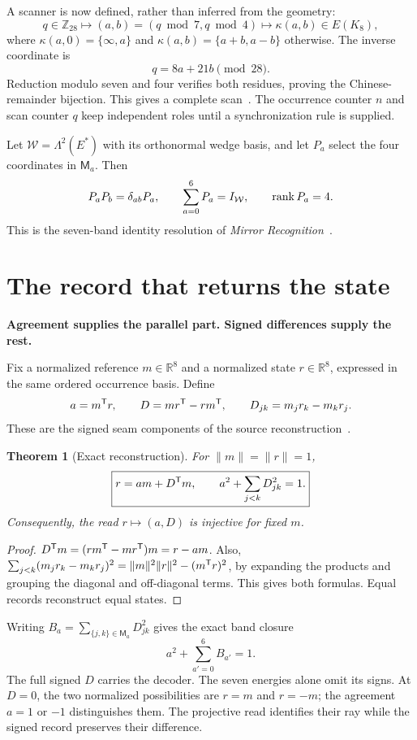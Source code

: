 \documentclass[11pt]{article}
\newtheorem{theorem}{Theorem}[section]
\theoremstyle{definition}\newtheorem{definition}[theorem]{Definition}
\newcommand{\R}{\mathbb R}\newcommand{\C}{\mathbb C}\newcommand{\Z}{\mathbb Z}\newcommand{\N}{\mathbb N}\newcommand{\PP}{\mathbb P}
\newcommand{\lead}[1]{\textbf{#1}\par}
\newcommand{\page}{\clearpage}
\begin{document}
A scanner is now defined, rather than inferred from the geometry:
\begin{equation}
 q\in\Z_{28}\longmapsto(a,b)=(q\bmod7,q\bmod4)
 \longmapsto\kappa(a,b)\in E(K_8),
\end{equation}
where $\kappa(a,0)=\{\infty,a\}$ and $\kappa(a,b)=\{a+b,a-b\}$ otherwise. The inverse coordinate is
\begin{equation}
 q=8a+21b\pmod{28}.
\end{equation}
Reduction modulo seven and four verifies both residues, proving the Chinese-remainder bijection. This gives a complete scan~\cite[\S6]{LM11}. The occurrence counter $n$ and scan counter $q$ keep independent roles until a synchronization rule is supplied.

Let $\mathcal W=\Lambda^2(E^*)$ with its orthonormal wedge basis, and let $P_a$ select the four coordinates in $\mathsf M_a$. Then
\begin{equation}
 P_aP_b=\delta_{ab}P_a,\qquad\sum_{a=0}^{6}P_a=I_{\mathcal W},\qquad\operatorname{rank} P_a=4.
 \label{eq:resolution}
\end{equation}
This is the seven-band identity resolution of \emph{Mirror Recognition}~\cite[\S9]{MR}.

\page
\section{The record that returns the state}
\lead{Agreement supplies the parallel part. Signed differences supply the rest.}
Fix a normalized reference $m\in\R^8$ and a normalized state $r\in\R^8$, expressed in the same ordered occurrence basis. Define
\begin{equation}
 a=m^\mathsf T r,\qquad D=mr^\mathsf T-rm^\mathsf T,\qquad
 D_{jk}=m_jr_k-m_kr_j.
 \label{eq:record}
\end{equation}
These are the signed seam components of the source reconstruction~\cite[\S8]{MR}.

\begin{theorem}[Exact reconstruction]
For $\|m\|=\|r\|=1$,
\begin{equation}
 \boxed{r=am+D^\mathsf T m,\qquad a^2+\sum_{j<k}D_{jk}^2=1.}
 \label{eq:decoder}
\end{equation}
Consequently, the read $r\mapsto(a,D)$ is injective for fixed $m$.
\end{theorem}
\begin{proof}
$D^\mathsf T m=(rm^\mathsf T-mr^\mathsf T)m=r-am$. Also,
$\sum_{j<k}(m_jr_k-m_kr_j)^2=\|m\|^2\|r\|^2-(m^\mathsf T r)^2$,
by expanding the products and grouping the diagonal and off-diagonal terms. This gives both formulas. Equal records reconstruct equal states.
\end{proof}
Writing $B_a=\sum_{\{j,k\}\in\mathsf M_a}D_{jk}^2$ gives the exact band closure
\begin{equation}
 a^2+\sum_{a'=0}^{6}B_{a'}=1.
\end{equation}
The full signed $D$ carries the decoder. The seven energies alone omit its signs. At $D=0$, the two normalized possibilities are $r=m$ and $r=-m$; the agreement $a=1$ or $-1$ distinguishes them. The projective read identifies their ray while the signed record preserves their difference.
\end{document}
